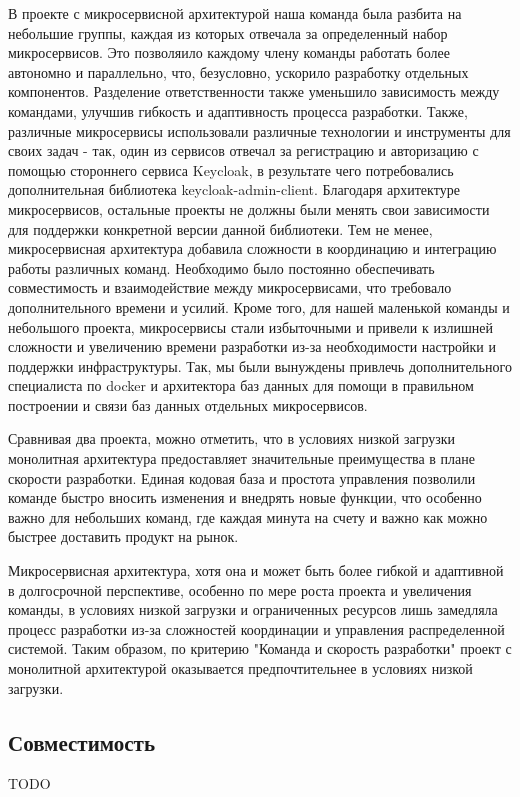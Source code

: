     В проекте с микросервисной архитектурой наша команда была разбита на небольшие группы, каждая из которых отвечала за определенный набор микросервисов. Это позволяило каждому члену команды работать более автономно и параллельно, что, безусловно, ускорило разработку отдельных компонентов. Разделение ответственности также уменьшило зависимость между командами, улучшив гибкость и адаптивность процесса разработки. Также, различные микросервисы использовали различные технологии и инструменты для своих задач - так, один из сервисов отвечал за регистрацию и авторизацию с помощью стороннего сервиса Keycloak, в результате чего потребовались дополнительная библиотека keycloak-admin-client. Благодаря архитектуре микросервисов, остальные проекты не должны были менять свои зависимости для поддержки конкретной версии данной библиотеки. Тем не менее, микросервисная архитектура добавила сложности в координацию и интеграцию работы различных команд. Необходимо было постоянно обеспечивать совместимость и взаимодействие между микросервисами, что требовало дополнительного времени и усилий. Кроме того, для нашей маленькой команды и небольшого проекта, микросервисы стали избыточными и привели к излишней сложности и увеличению времени разработки из-за необходимости настройки и поддержки инфраструктуры. Так, мы были вынуждены привлечь дополнительного специалиста по docker и архитектора баз данных для помощи в правильном построении и связи баз данных отдельных микросервисов.
    
    Сравнивая два проекта, можно отметить, что в условиях низкой загрузки монолитная архитектура предоставляет значительные преимущества в плане скорости разработки. Единая кодовая база и простота управления позволили команде быстро вносить изменения и внедрять новые функции, что особенно важно для небольших команд, где каждая минута на счету и важно как можно быстрее доставить продукт на рынок.
    
    Микросервисная архитектура, хотя она и может быть более гибкой и адаптивной в долгосрочной перспективе, особенно по мере роста проекта и увеличения команды, в условиях низкой загрузки и ограниченных ресурсов лишь замедляла процесс разработки из-за сложностей координации и управления распределенной системой. Таким образом, по критерию "Команда и скорость разработки" проект с монолитной архитектурой оказывается предпочтительнее в условиях низкой загрузки.

\subsection{Совместимость}
    TODO

